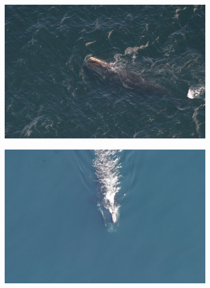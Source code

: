 \documentclass[12pt,a4paper]{report}
\begin{document}
\begin{spacing}{1.5}
\begin{figure}[H]
\medskip
\begin{subfigure}{0.55\textwidth}
\includegraphics[width=\linewidth]{figures/whalesImg/w3.jpg}
\end{subfigure}\hspace*{\fill}
\begin{subfigure}{0.55\textwidth}
\includegraphics[width=\linewidth]{figures/whalesImg/w4.jpg}
\end{subfigure}


\end{figure}
\end{spacing}
\end{document}
